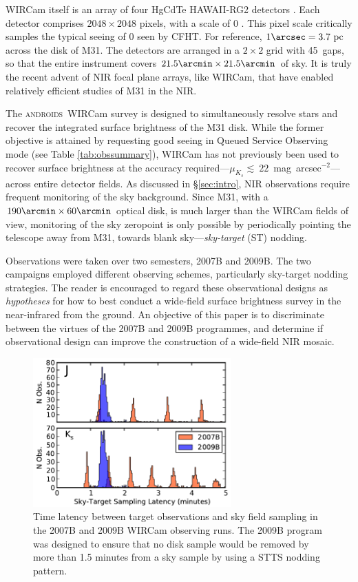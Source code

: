 \documentclass[iop]{emulateapj}
\newcommand{\androids}{\textsc{androids}}
\begin{document}
WIRCam itself is an array of four HgCdTe HAWAII-RG2 detectors \citep{Puget:2004}. Each detector comprises $2048\times 2048$ pixels, with a scale of 0 . This pixel scale critically samples the typical seeing of 0 seen by CFHT. For reference, $1\arcsec = 3.7~\mathrm{pc}$ across the disk of M31. The detectors are arranged in a $2\times 2$ grid with 45\arcsec\ gaps, so that the entire instrument covers $21.5\arcmin \times 21.5\arcmin$ of sky. It is truly the recent advent of NIR focal plane arrays, like WIRCam, that have enabled relatively efficient studies of M31 in the NIR.

The \androids\ WIRCam survey is designed to simultaneously resolve stars and recover the integrated surface brightness of the M31 disk. While the former objective is attained by requesting good seeing in Queued Service Observing mode (see Table \ref{tab:obssummary}), WIRCam has not previously been used to recover surface brightness at the accuracy required---$\mu_{K_s}\lesssim~22$~mag~arcsec$^{-2}$---across entire detector fields. As discussed in \S \ref{sec:intro}, NIR observations require frequent monitoring of the sky background. Since M31, with a $190\arcmin \times 60\arcmin$ optical disk, is much larger than the WIRCam fields of view, monitoring of the sky zeropoint is only possible by periodically pointing the telescope away from M31, towards blank sky---\emph{sky-target} (ST) nodding. 

Observations were taken over two semesters, 2007B and 2009B. The two campaigns employed different observing schemes, particularly sky-target nodding strategies. The reader is encouraged to regard these observational designs as \emph{hypotheses} for how to best conduct a wide-field surface brightness survey in the near-infrared from the ground. An objective of this paper is to discriminate between the virtues of the 2007B and 2009B programmes, and determine if observational design can improve the construction of a wide-field NIR mosaic.

\begin{figure}[t]
    \centering
        \includegraphics[width=3in]{figs/sky_target_lag}
    \caption{Time latency between target observations and sky field sampling in the 2007B and 2009B WIRCam observing runs. The 2009B program was designed to ensure that no disk sample would be removed by more than 1.5 minutes from a sky sample by using a STTS nodding pattern.}
    \label{fig:sky_target_lag}
\end{figure}
\end{document}
